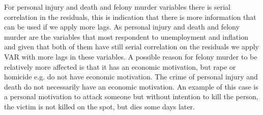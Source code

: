 \documentclass[11pt, a4paper]{article}
\begin{document}
For personal injury and death and felony murder variables there is serial correlation in the residuals, this is indication that there is more information that can be used if we apply more lags.
As personal injury and death and felony murder are the variables that most respondent to unemployment and inflation  and given that both of them have still serial correlation on the residuals we apply VAR with more lags in these variables. 
A possible reason for felony murder to be relatively more affected is that it has an economic motivation, but rape or homicide e.g. do not have economic motivation. 
The crime of personal injury and death do not necessarily have an economic motivation. An example of this case is a personal motivation to attack someone but without intention to kill the person, the victim is not killed on the spot, but dies some days later.
\end{document}
